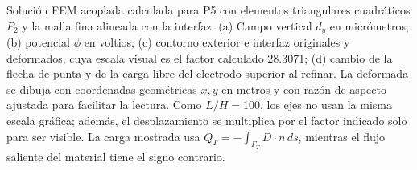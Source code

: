 Solución FEM acoplada calculada para P5 con elementos triangulares
cuadráticos \(P_2\) y la malla fina alineada con la interfaz. (a) Campo
vertical \(d_y\) en micrómetros; (b) potencial \(\phi\) en voltios; (c)
contorno exterior e interfaz originales y deformados, cuya escala visual es el factor calculado
28.3071; (d) cambio de la flecha de punta y de la carga libre del
electrodo superior al refinar. La deformada se dibuja con coordenadas
geométricas \(x,y\) en metros y con razón de aspecto ajustada para facilitar
la lectura. Como \(L/H=100\), los ejes no usan la misma escala gráfica; además,
el desplazamiento se multiplica por el factor indicado solo para ser visible.
La carga mostrada usa
\(Q_T=-\int_{\Gamma_T}D\!\cdot n\,ds\), mientras el flujo saliente del
material tiene el signo contrario.
